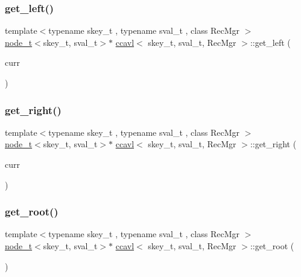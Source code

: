 \mbox{\label{classccavl_a3a0b0d9511f6c33a366df29b7e5e78c6}} 
\subsubsection{\texorpdfstring{get\+\_\+left()}{get\_left()}}
{\footnotesize\ttfamily template$<$typename skey\+\_\+t , typename sval\+\_\+t , class Rec\+Mgr $>$ \\
\hyperlink{structnode__t}{node\+\_\+t}$<$skey\+\_\+t, sval\+\_\+t$>$$\ast$ \hyperlink{classccavl}{ccavl}$<$ skey\+\_\+t, sval\+\_\+t, Rec\+Mgr $>$\+::get\+\_\+left (\begin{DoxyParamCaption}\item[{\hyperlink{structnode__t}{node\+\_\+t}$<$ skey\+\_\+t, sval\+\_\+t $>$ $\ast$}]{curr }\end{DoxyParamCaption})\hspace{0.3cm}{\ttfamily [inline]}}

\mbox{\label{classccavl_adea629204a5f01be8cf538a84a82cbe0}} 
\subsubsection{\texorpdfstring{get\+\_\+right()}{get\_right()}}
{\footnotesize\ttfamily template$<$typename skey\+\_\+t , typename sval\+\_\+t , class Rec\+Mgr $>$ \\
\hyperlink{structnode__t}{node\+\_\+t}$<$skey\+\_\+t, sval\+\_\+t$>$$\ast$ \hyperlink{classccavl}{ccavl}$<$ skey\+\_\+t, sval\+\_\+t, Rec\+Mgr $>$\+::get\+\_\+right (\begin{DoxyParamCaption}\item[{\hyperlink{structnode__t}{node\+\_\+t}$<$ skey\+\_\+t, sval\+\_\+t $>$ $\ast$}]{curr }\end{DoxyParamCaption})\hspace{0.3cm}{\ttfamily [inline]}}

\mbox{\label{classccavl_ad6813e2b580885b73267281299aaf91b}} 
\subsubsection{\texorpdfstring{get\+\_\+root()}{get\_root()}}
{\footnotesize\ttfamily template$<$typename skey\+\_\+t , typename sval\+\_\+t , class Rec\+Mgr $>$ \\
\hyperlink{structnode__t}{node\+\_\+t}$<$skey\+\_\+t, sval\+\_\+t$>$$\ast$ \hyperlink{classccavl}{ccavl}$<$ skey\+\_\+t, sval\+\_\+t, Rec\+Mgr $>$\+::get\+\_\+root (\begin{DoxyParamCaption}{ }\end{DoxyParamCaption})\hspace{0.3cm}{\ttfamily [inline]}}

